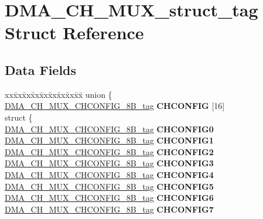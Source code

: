 \hypertarget{structDMA__CH__MUX__struct__tag}{}\section{D\+M\+A\+\_\+\+C\+H\+\_\+\+M\+U\+X\+\_\+struct\+\_\+tag Struct Reference}
\label{structDMA__CH__MUX__struct__tag}
\subsection*{Data Fields}
\begin{DoxyCompactItemize}
\item 
\mbox{\label{structDMA__CH__MUX__struct__tag_a7ba57ac864ae9aeb6ed6e0713448f37a}} 
\begin{tabbing}
xx\=xx\=xx\=xx\=xx\=xx\=xx\=xx\=xx\=\kill
union \{\\
\>\mbox{\hyperlink{unionDMA__CH__MUX__CHCONFIG__8B__tag}{DMA\_CH\_MUX\_CHCONFIG\_8B\_tag}} {\bfseries CHCONFIG} \mbox{[}16\mbox{]}\\
\mbox{\label{unionDMA__CH__MUX__struct__tag_1_1_0D2367_a77a6ea92bee489e8bb48ede317fb5591}} 
\>struct \{\\
\>\>\mbox{\hyperlink{unionDMA__CH__MUX__CHCONFIG__8B__tag}{DMA\_CH\_MUX\_CHCONFIG\_8B\_tag}} {\bfseries CHCONFIG0}\\
\>\>\mbox{\hyperlink{unionDMA__CH__MUX__CHCONFIG__8B__tag}{DMA\_CH\_MUX\_CHCONFIG\_8B\_tag}} {\bfseries CHCONFIG1}\\
\>\>\mbox{\hyperlink{unionDMA__CH__MUX__CHCONFIG__8B__tag}{DMA\_CH\_MUX\_CHCONFIG\_8B\_tag}} {\bfseries CHCONFIG2}\\
\>\>\mbox{\hyperlink{unionDMA__CH__MUX__CHCONFIG__8B__tag}{DMA\_CH\_MUX\_CHCONFIG\_8B\_tag}} {\bfseries CHCONFIG3}\\
\>\>\mbox{\hyperlink{unionDMA__CH__MUX__CHCONFIG__8B__tag}{DMA\_CH\_MUX\_CHCONFIG\_8B\_tag}} {\bfseries CHCONFIG4}\\
\>\>\mbox{\hyperlink{unionDMA__CH__MUX__CHCONFIG__8B__tag}{DMA\_CH\_MUX\_CHCONFIG\_8B\_tag}} {\bfseries CHCONFIG5}\\
\>\>\mbox{\hyperlink{unionDMA__CH__MUX__CHCONFIG__8B__tag}{DMA\_CH\_MUX\_CHCONFIG\_8B\_tag}} {\bfseries CHCONFIG6}\\
\>\>\mbox{\hyperlink{unionDMA__CH__MUX__CHCONFIG__8B__tag}{DMA\_CH\_MUX\_CHCONFIG\_8B\_tag}} {\bfseries CHCONFIG7}\\

\end{tabbing}
\end{DoxyCompactItemize}
